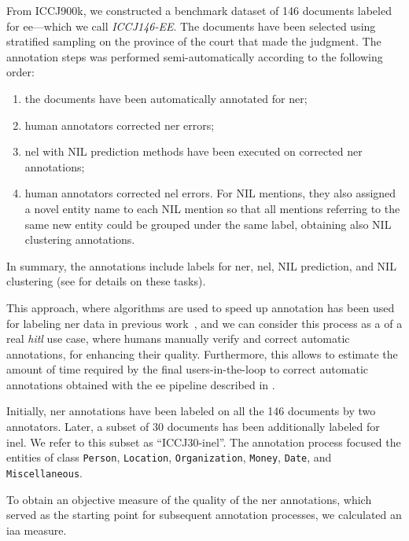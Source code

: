 From ICCJ900k, we constructed a benchmark dataset of 146 documents labeled for \acf{ee}---which we call \emph{ICCJ146-EE}. The documents have been selected using stratified sampling on the province of the court that made the judgment.
The annotation steps was performed semi-automatically according to the following order:
\begin{enumerate}
    \item the documents have been automatically annotated for \ac{ner};
    \item human annotators corrected \ac{ner} errors;
    \item \ac{nel} with NIL prediction methods have been executed on corrected \ac{ner} annotations;
    \item human annotators corrected \ac{nel} errors. For NIL mentions, they also assigned a novel entity name to each NIL mention so that all mentions referring to the same new entity could be grouped under the same label, obtaining also NIL clustering annotations.
\end{enumerate}
In summary, the annotations include labels for \ac{ner}, \ac{nel}, NIL prediction, and NIL clustering (see  for details on these tasks).

This approach, where algorithms are used to speed up annotation has been used for labeling \ac{ner} data in previous work~\cite{lrec2022kind}, and we can consider this process as a  of a real \emph{\acf{hitl}} use case, where humans manually verify and correct automatic annotations, for enhancing their quality.
Furthermore, this  allows to estimate the amount of time required by the final users-in-the-loop to correct automatic annotations obtained with the \ac{ee} pipeline described in .

Initially, \ac{ner} annotations have been labeled on all the 146 documents by two annotators. Later, a subset of 30 documents has been additionally labeled for \ac{inel}. We refer to this subset as ``ICCJ30-\ac{inel}''.
The annotation process focused the entities of class \texttt{Person}, \texttt{Location}, \texttt{Organization}, \texttt{Money}, \texttt{Date}, and \texttt{Miscellaneous}.


To obtain an objective measure of the quality of the \ac{ner} annotations, which served as the starting point for subsequent annotation processes, we calculated an \acf{iaa} measure.


